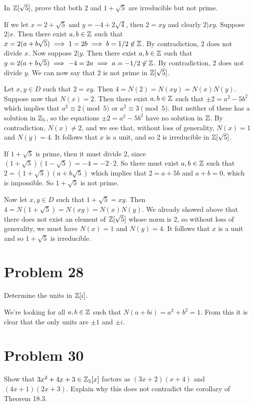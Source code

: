 \documentclass{article}
\begin{document}
In $\mathbb{Z}[\sqrt{5}]$, prove that both $2$ and $1+\sqrt{5}$ are irreducible but not prime.

If we let $x=2+\sqrt{5}$ and $y=-4+2\sqrt{4}$, then $2=xy$ and clearly $2|xy$.
Suppose $2|x$.  Then there exist $a,b\in\mathbb{Z}$ such that
$x=2(a+b\sqrt{5})\implies 1=2b\implies b=1/2\not\in\mathbb{Z}$.  By contradiction,
$2$ does not divide $x$.  Now suppose $2|y$.  Then there exist $a,b\in\mathbb{Z}$ such that
$y=2(a+b\sqrt{5})\implies -4=2a\implies a=-1/2\not\in\mathbb{Z}$.  By contradiction,
$2$ does not divide $y$.  We can now say that $2$ is not prime in $\mathbb{Z}[\sqrt{5}]$.

Let $x,y\in D$ such that $2=xy$.  Then $4=N(2)=N(xy)=N(x)N(y)$.
Suppose now that $N(x)=2$.  Then there exist $a,b\in\mathbb{Z}$ such that
$\pm 2=a^2-5b^2$ which implies that $a^2\equiv 2\pmod{5}$ or
$a^2\equiv 3\pmod{5}$.  But neither of these has a solution in $\mathbb{Z}_5$,
so the equations $\pm 2=a^2-5b^2$ have no solution in $\mathbb{Z}$.  By contradiction, $N(x)\neq 2$,
and we see that, without loss of generality, $N(x)=1$ and $N(y)=4$.
It follows that $x$ is a unit, and so 2 is irreducible in $\mathbb{Z}[\sqrt{5}]$.

If $1+\sqrt{5}$ is prime, then it must divide 2, since
$(1+\sqrt{5})(1-\sqrt{5})=-4=-2\cdot 2$.  So there must exist $a,b\in\mathbb{Z}$
such that $2=(1+\sqrt{5})(a+b\sqrt{5})$ which implies that $2=a+5b$ and $a+b=0$,
which is impossible.  So $1+\sqrt{5}$ is not prime.

Now let $x,y\in D$ such that $1+\sqrt{5}=xy$.  Then $4=N(1+\sqrt{5})=N(xy)=N(x)N(y)$.
We already showed above that there does not exist an element of $\mathbb{Z}[\sqrt{5}]$
whose norm is 2, so without loss of generality, we must have $N(x)=1$ and $N(y)=4$.
It follows that $x$ is a unit and so $1+\sqrt{5}$ is irreducible.

\section*{Problem 28}

Determine the units in $\mathbb{Z}[i]$.

We're looking for all $a,b\in\mathbb{Z}$ such that $N(a+bi)=a^2+b^2=1$.  From this it is
clear that the only units are $\pm 1$ and $\pm i$.

\section*{Problem 30}

Show that $3x^2+4x+3\in\mathbb{Z}_5[x]$ factors as $(3x+2)(x+4)$ and
$(4x+1)(2x+3)$.  Explain why this does not contradict the corollary
of Theorem 18.3.
\end{document}
